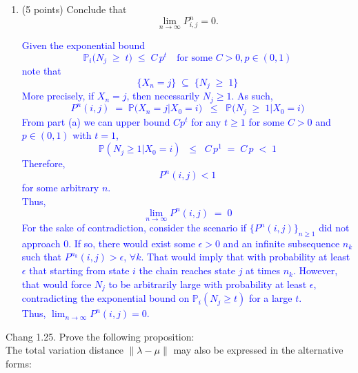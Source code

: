 \documentclass{article}
\begin{document}
\begin{enumerate}[label=(\alph*)]
\item (5 points) Conclude that 
\[
\lim_{n \to \infty} P^n_{i,j} = 0.
\]

\textcolor{blue}{
    Given the exponential bound
\[
\mathbb{P}_i\bigl(N_j \;\ge\; t\bigr) \;\le\; C\,p^t
\quad \text{for some }C>0, p\in (0,1)
\]
note that
\[
\{X_n = j\}
\;\subseteq\;
\{N_j \;\ge\; 1\}
\]
More precisely, if $X_n = j$, then necessarily $N_j \ge 1$. 
As such,
\[
P^n(i,j) 
\;=\;
\mathbb{P}\bigl(X_n = j\bigr | X_0=i)
\;\;\le\;\;
\mathbb{P}\bigl(N_j \;\ge\; 1 | X_0=i\bigr)
\]
From part (a) we can upper bound $Cp^t$ for any $t\geq 1$ for some $C>0$ and $p\in(0,1)$ with $t=1$,
\[
\mathbb{P}(N_j \ge 1 | X_0=i) 
\;\;\le\;\;
C \, p^1 
\;=\;
C\,p
\;<\; 
1
\]
Therefore, $$P^n(i,j) < 1$$ for some arbitrary $n$. \\
Thus,
\[
\lim_{n\to\infty} P^n(i,j) 
\;=\; 0
\]
For the sake of contradiction, consider the scenario if $\{P^n(i,j)\}_{n\ge1}$ did not approach $0$. If so,
there would exist some $\epsilon>0$ and an infinite subsequence $n_k$ such that $P^{n_k}(i,j) > \epsilon$, $\forall k$. 
That would imply that with probability at least $\epsilon$ that starting from state $i$ the chain reaches state $j$ at times $n_k$. 
However, that would force $N_j$ to be arbitrarily large with probability at least $\epsilon$, contradicting the exponential bound on $\mathbb{P}_i(N_j \ge t)$ for a large $t$. \\
Thus, $\lim_{n\to\infty} P^n(i,j) =0$.
}

\end{enumerate}

Chang 1.25. Prove the following proposition:  \\
The total variation distance $\|\lambda - \mu\|$ may also be expressed in the alternative forms:
\end{document}
